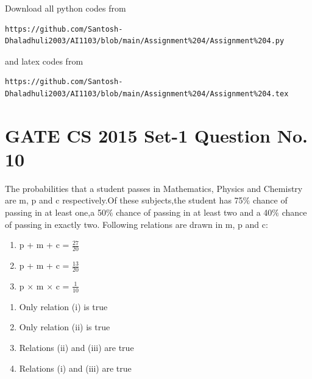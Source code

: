 \documentclass[journal,12pt,twocolumn]{IEEEtran}
\begin{document}
Download all python codes from 
\begin{lstlisting}
https://github.com/Santosh-Dhaladhuli2003/AI1103/blob/main/Assignment%204/Assignment%204.py
\end{lstlisting}
%
and latex codes from 
%
\begin{lstlisting}
https://github.com/Santosh-Dhaladhuli2003/AI1103/blob/main/Assignment%204/Assignment%204.tex
\end{lstlisting}
\section{\textbf{GATE CS 2015 Set-1 Question No. 10}}
The probabilities that a student passes in Mathematics, Physics and Chemistry are m, p and c respectively.Of these subjects,the student has 75$\%$ chance of passing in at least one,a 50$\%$ chance of passing in at least two and a 40$\%$ chance of passing in exactly two. Following relations are drawn in m, p and c:
 \begin{enumerate}[label=(\roman*)]
 \item p + m + c = $\frac{27}{20}$ 
 \item p + m + c = $\frac{13}{20}$ 
 \item p $\times$ m $\times$ c = $\frac{1}{10}$
 \end{enumerate}
 \vspace{0.5cm}
\begin{enumerate}
    \item Only relation (i) is true
    \item Only relation (ii) is true
    \item Relations (ii) and (iii) are true
    \item Relations (i) and (iii) are true
\end{enumerate}
\end{document}
